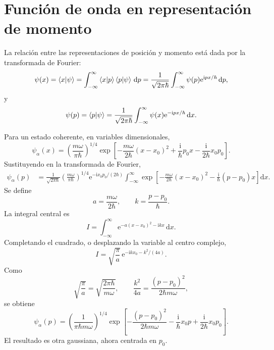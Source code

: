 \documentclass[11pt]{article}
\newcommand{\ii}{\mathrm{i}}
\newcommand{\ee}{\mathrm{e}}
\newcommand{\dd}{\mathrm{d}}
\begin{document}
\section{Funci\'on de onda en representaci\'on de momento}

La relaci\'on entre las representaciones de posici\'on y momento est\'a dada por
la transformada de Fourier:
\begin{equation}
  \psi(x)
  =
  \braket{x|\psi}
  =
  \int_{-\infty}^{\infty}
  \braket{x|p}\braket{p|\psi}\,\dd p
  =
  \frac{1}{\sqrt{2\pi\hbar}}
  \int_{-\infty}^{\infty}
  \psi(p)\ee^{\ii px/\hbar}\,\dd p,
\end{equation}
y
\begin{equation}
  \psi(p)
  =
  \braket{p|\psi}
  =
  \frac{1}{\sqrt{2\pi\hbar}}
  \int_{-\infty}^{\infty}
  \psi(x)\ee^{-\ii px/\hbar}\,\dd x.
\end{equation}

Para un estado coherente, en variables dimensionales,
\begin{equation}
  \psi_\alpha(x)
  =
  \left(\frac{m\omega}{\pi\hbar}\right)^{1/4}
  \exp\left[
  -\frac{m\omega}{2\hbar}(x-x_0)^2
  +\frac{\ii}{\hbar}p_0x
  -\frac{\ii}{2\hbar}x_0p_0
  \right].
\end{equation}
Sustituyendo en la transformada de Fourier,
\begin{align}
  \psi_\alpha(p)
  &=
  \frac{1}{\sqrt{2\pi\hbar}}
  \left(\frac{m\omega}{\pi\hbar}\right)^{1/4}
  \ee^{-\ii x_0p_0/(2\hbar)}
  \int_{-\infty}^{\infty}
  \exp\left[
  -\frac{m\omega}{2\hbar}(x-x_0)^2
  -\frac{\ii}{\hbar}(p-p_0)x
  \right]\dd x.
\end{align}
Se define
\begin{equation}
  a=\frac{m\omega}{2\hbar},
  \qquad
  k=\frac{p-p_0}{\hbar}.
\end{equation}
La integral central es
\begin{equation}
  I=\int_{-\infty}^{\infty}
  \ee^{-a(x-x_0)^2-\ii kx}\,\dd x.
\end{equation}
Completando el cuadrado, o desplazando la variable al centro complejo,
\begin{equation}
  I
  =
  \sqrt{\frac{\pi}{a}}\,
  \ee^{-\ii kx_0-k^2/(4a)}.
\end{equation}
Como
\begin{equation}
  \sqrt{\frac{\pi}{a}}
  =
  \sqrt{\frac{2\pi\hbar}{m\omega}},
  \qquad
  \frac{k^2}{4a}
  =
  \frac{(p-p_0)^2}{2\hbar m\omega},
\end{equation}
se obtiene
\begin{equation}
  \boxed{
  \psi_\alpha(p)
  =
  \left(\frac{1}{\pi\hbar m\omega}\right)^{1/4}
  \exp\left[
  -\frac{(p-p_0)^2}{2\hbar m\omega}
  -\frac{\ii}{\hbar}x_0p
  +\frac{\ii}{2\hbar}x_0p_0
  \right].
  }
\end{equation}
El resultado es otra gaussiana, ahora centrada en $p_0$.
\end{document}
